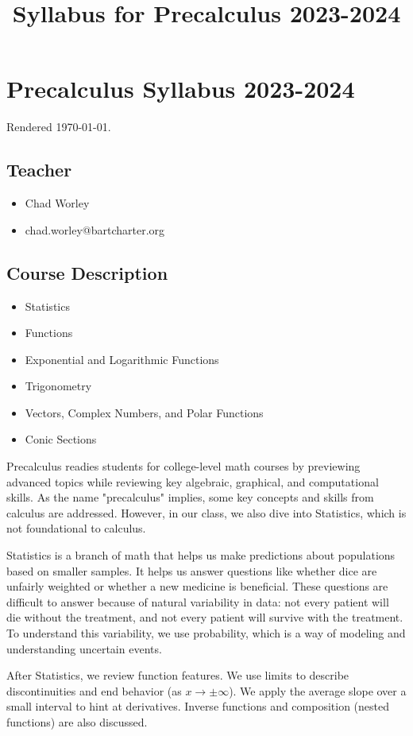 \documentclass[12pt]{article}
\title{Syllabus for Precalculus 2023-2024}
\begin{document}
\section*{Precalculus Syllabus 2023-2024}

Rendered \today.

\subsection*{Teacher}

\begin{itemize}
\item Chad Worley
\item chad.worley@bartcharter.org
\end{itemize}

\subsection*{Course Description}

\begin{itemize}
\item Statistics
\item Functions
\item Exponential and Logarithmic Functions
\item Trigonometry
\item Vectors, Complex Numbers, and Polar Functions
\item Conic Sections
\end{itemize}

Precalculus readies students for college-level math courses by previewing advanced topics while reviewing key algebraic, graphical, and computational skills. As the name "precalculus" implies, some key concepts and skills from calculus are addressed. However, in our class, we also dive into Statistics, which is not foundational to calculus.

Statistics is a branch of math that helps us make predictions about populations based on smaller samples. It helps us answer questions like whether dice are unfairly weighted or whether a new medicine is beneficial. These questions are difficult to answer because of natural variability in data: not every patient will die without the treatment, and not every patient will survive with the treatment. To understand this variability, we use probability, which is a way of modeling and understanding uncertain events.

After Statistics, we review function features. We use limits to describe discontinuities and end behavior (as $x\to\pm\infty$). We apply the average slope over a small interval to hint at derivatives. Inverse functions and composition (nested functions) are also discussed.
\end{document}
